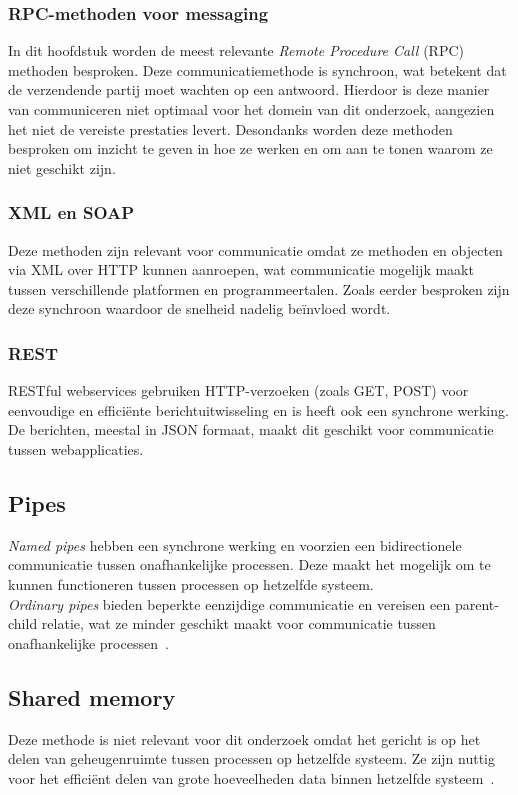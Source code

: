 \subsubsection{RPC-methoden voor messaging}
In dit hoofdstuk worden de meest relevante \emph{Remote Procedure Call} (RPC) methoden besproken. 
Deze communicatiemethode is synchroon, wat betekent dat de verzendende partij moet wachten op een antwoord.
Hierdoor is deze manier van communiceren niet optimaal voor het domein van dit onderzoek, 
aangezien het niet de vereiste prestaties levert. 
Desondanks worden deze methoden besproken om inzicht te geven in hoe ze werken en om aan te tonen waarom ze niet geschikt zijn.

\subsubsection{XML en SOAP}
Deze methoden zijn relevant voor communicatie omdat ze methoden en objecten via XML over HTTP kunnen aanroepen,
wat communicatie mogelijk maakt tussen verschillende platformen en programmeertalen.
Zoals eerder besproken zijn deze synchroon waardoor de snelheid nadelig beïnvloed wordt.

\subsubsection{REST}
RESTful webservices gebruiken HTTP-verzoeken (zoals GET, POST) voor eenvoudige en efficiënte berichtuitwisseling en is heeft ook een synchrone werking. 
De berichten, meestal in JSON formaat, maakt dit geschikt voor communicatie tussen webapplicaties.

\subsection{Pipes}
\emph{Named pipes} hebben een synchrone werking en voorzien een bidirectionele 
communicatie tussen onafhankelijke processen.
Deze maakt het mogelijk om te kunnen functioneren tussen processen op hetzelfde systeem.
\\
\emph{Ordinary pipes} bieden beperkte eenzijdige communicatie en vereisen een parent-child relatie, 
wat ze minder geschikt maakt voor communicatie tussen onafhankelijke processen~\autocite{Dinari2020}.

\subsection{Shared memory}
Deze methode is niet relevant voor dit onderzoek omdat het gericht is op het delen van geheugenruimte 
tussen processen op hetzelfde systeem. 
Ze zijn nuttig voor het efficiënt delen van grote hoeveelheden data binnen hetzelfde systeem~\autocite{Dinari2020}.


